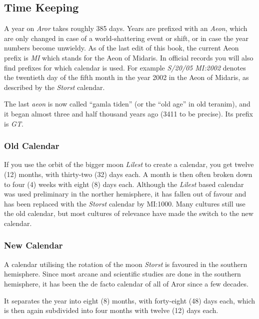 \subsection{Time Keeping}

A year on \emph{Aror} takes roughly 385 days. Years are prefixed with an
\emph{Aeon}, which are only changed in case of a world-shattering event
or shift, or in case the year numbers become unwieldy. As of the last
edit of this book, the current Aeon prefix is \emph{MI} which stands for
the Aeon of Midaris. In official records you will also find prefixes for
which calendar is used. For example \emph{S/20/05 MI:2002} denotes the
twentieth day of the fifth month in the year 2002 in the Aeon of
Midaris, as described by the \emph{Storst} calendar.

The last \emph{aeon} is now called ``gamla tiden'' (or the ``old age'' in old
teranim), and it began almost three and half thousand years ago (3411 to be
precise). Its prefix is \emph{GT}.

\subsubsection{Old Calendar}
\label{sec:Old Calendar}

If you use the orbit of the bigger moon \emph{Lilest} to create a
calendar, you get twelve (12) months, with thirty-two (32) days
each. A month is then often broken down to four (4) weeks with eight
(8) days each. Although the \emph{Lilest} based calendar was used
preliminary in the norther hemisphere, it has fallen out of favour and
has been replaced with the \emph{Storst} calendar by MI:1000. Many
cultures still use the old calendar, but most cultures of relevance
have made the switch to the new calendar.

\subsubsection{New Calendar}
\label{sec:New Calendar}

A calendar utilising the rotation of the moon \emph{Storst} is favoured
in the southern hemisphere. Since most arcane and scientific studies are
done in the southern hemisphere, it has been the de facto calendar of all
of Aror since a few decades.

It separates the year into eight (8) months, with forty-eight (48) days
each, which is then again subdivided into four months with twelve (12)
days each.
